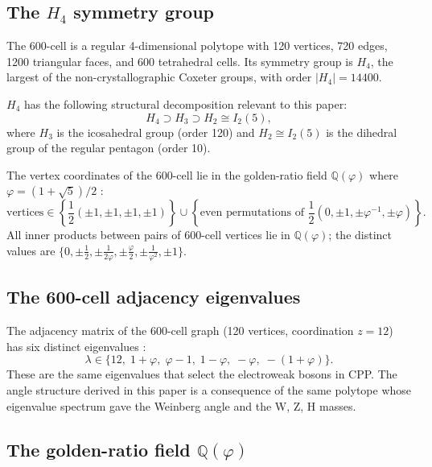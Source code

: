 \documentclass[11pt,letterpaper]{article}
\newcommand{\phig}{\varphi}
\begin{document}
\subsection{The $H_4$ symmetry group}

The 600-cell is a regular 4-dimensional polytope with 120 vertices,
720 edges, 1200 triangular faces, and 600 tetrahedral cells.  Its
symmetry group is $H_4$, the largest of the non-crystallographic
Coxeter groups, with order $|H_4| = 14400$.

$H_4$ has the following structural decomposition relevant to this
paper:
\begin{equation}
H_4 \supset H_3 \supset H_2 \cong I_2(5),
\label{eq:H4_chain}
\end{equation}
where $H_3$ is the icosahedral group (order 120) and $H_2 \cong
I_2(5)$ is the dihedral group of the regular pentagon (order 10).

The vertex coordinates of the 600-cell lie in the golden-ratio field
$\mathbb{Q}(\phig)$ where $\phig = (1+\sqrt5)/2$
\citep{coxeter1973,brouwer1989}:
\begin{equation}
\text{vertices} \in
\left\{\frac{1}{2}(\pm1,\pm1,\pm1,\pm1)\right\}
\cup
\left\{\text{even permutations of }
\frac{1}{2}(0,\pm1,\pm\phig^{-1},\pm\phig)\right\}.
\label{eq:vertices}
\end{equation}
All inner products between pairs of 600-cell vertices lie in
$\mathbb{Q}(\phig)$; the distinct values are
$\{0, \pm\frac{1}{2}, \pm\frac{1}{2\phig}, \pm\frac{\phig}{2},
\pm\frac{1}{\phig^2}, \pm1\}$.

\subsection{The 600-cell adjacency eigenvalues}

The adjacency matrix of the 600-cell graph (120 vertices,
coordination $z=12$) has six distinct eigenvalues
\citep{cpp_ew_unified}:
\begin{equation}
\lambda \in \{12,\;1+\phig,\;\phig-1,\;1-\phig,\;-\phig,\;-(1+\phig)\}.
\label{eq:eigenvalues}
\end{equation}
These are the same eigenvalues that select the electroweak bosons
in CPP.  The angle structure derived in this paper is a consequence
of the same polytope whose eigenvalue spectrum gave the Weinberg angle
and the W, Z, H masses.

\subsection{The golden-ratio field $\mathbb{Q}(\phig)$}
\end{document}
